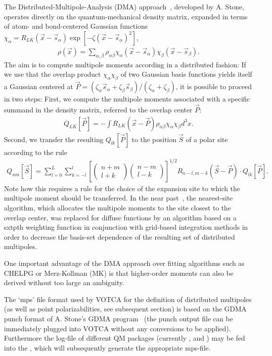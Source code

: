 The Distributed-Multipole-Analysis (DMA) approach~\cite{stone_distributed_1985, stone_distributed_2005}, developed by A. Stone, operates directly on the quantum-mechanical density matrix, expanded in terms of atom- and bond-centered Gaussian functions $\chi_\alpha = R_{LK}(\vec{x}-\vec{s}_\alpha) \exp[-\zeta(\vec{x}-\vec{s}_\alpha)^2]$,
\begin{align}
 \rho(\vec{x}) = \sum_{\alpha,\beta} \rho_{\alpha\beta} \chi_\alpha(\vec{x}-\vec{s}_\alpha) \chi_\beta(\vec{x}-\vec{s}_\beta). 
\end{align}
The aim is to compute multipole moments according in a distributed fashion: If we use that the overlap product $\chi_\alpha \chi_\beta$ of two Gaussian basis functions yields itself a Gaussian centered at $\vec{P} = (\zeta_\alpha \vec{s}_\alpha + \zeta_\beta \vec{s}_\beta) / (\zeta_\alpha + \zeta_\beta)$, it is possible to proceed in two steps: First, we compute the multipole moments associated with a specific summand in the density matrix, referred to the overlap center $\vec{P}$:
\begin{align}
 Q_{LK}[\vec{P}] = - \int R_{LK}(\vec{x}-\vec{P}) \rho_{\alpha\beta} \chi_\alpha \chi_\beta d^3\!x.
\end{align}
Second, we transfer the resulting $Q_{lk}[\vec{P}]$ to the position $\vec{S}$ of a polar site according to the rule~\cite{stone_distributed_1985}
\begin{align}
 Q_{nm}[\vec{S}] = \sum_{l=0}^L \sum_{k=-l}^l \left[ \left(\begin{array}{c} n+m \\ l+k \end{array}\right)\left(\begin{array}{c} n-m \\ l-k \end{array}\right) \right]^{1/2} R_{n-l,m-k}(\vec{S}-\vec{P})\cdot Q_{lk}[\vec{P}].
\end{align}
Note how this requires a rule for the choice of the expansion site to which the multipole moment should be transferred. In the near past~\cite{stone_distributed_2005}, the nearest-site algorithm, which allocates the multipole moments to the site closest to the overlap center, was replaced for diffuse functions by an algorithm based on a sxtpth weighting function in conjunction with grid-based integration methods in order to decrease the basis-set dependence of the resulting set of distributed multipoles.

One important advantage of the DMA approach over fitting algorithms such as CHELPG or Merz-Kollman (MK) is that higher-order moments can also be derived without too large an ambiguity.

The `mps' file format used by VOTCA for the definition of distributed multipoles (as well as point polarizabilities, see subsequent section) is based on the GDMA punch format of A. Stone's GDMA program~\cite{stone_distributed_2005} (the punch output file can be immediately plugged into VOTCA without any conversions to be applied). Furthermore the log-file of different QM packages (currently \gaussian, \turbomole and \nwchem) may be fed into the  \tool, which will subsequently generate the appropriate mps-file.


